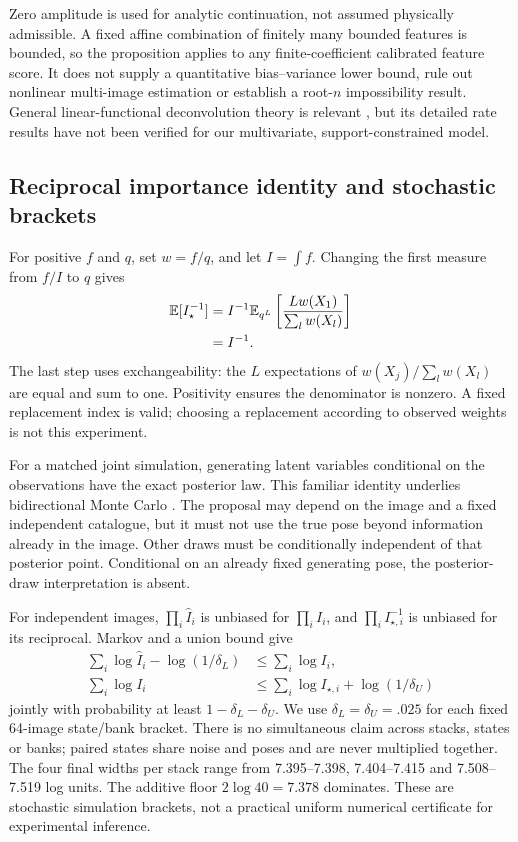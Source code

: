 Zero amplitude is used for analytic continuation, not assumed physically
admissible. A fixed affine combination of finitely many bounded features
is bounded, so the proposition applies to any finite-coefficient calibrated
feature score. It does not supply a quantitative bias--variance lower bound,
rule out nonlinear multi-image estimation or establish a root-$n$ impossibility
result. General linear-functional deconvolution theory is relevant
\citep{pensky2017}, but its detailed rate results have not been verified for
our multivariate, support-constrained model.

\subsection{Reciprocal importance identity and stochastic brackets}
For positive $f$ and $q$, set $w=f/q$, and let $I=\int f$.
Changing the first measure from $f/I$ to $q$ gives
\begin{align}
\mathbb E[I_\star^{-1}]&=I^{-1}\mathbb E_{q^L}
\left[\frac{Lw(X_1)}{\sum_lw(X_l)}\right]\\
&=I^{-1}.\nonumber
\end{align}
The last step uses exchangeability: the $L$ expectations of
$w(X_j)/\sum_lw(X_l)$ are equal and sum to one. Positivity ensures the
denominator is nonzero. A fixed replacement index is valid; choosing a
replacement according to observed weights is not this experiment.

For a matched joint simulation, generating latent variables conditional on
the observations have the exact posterior law. This familiar identity
underlies bidirectional Monte Carlo \citep{grosse2015}. The proposal may
depend on the image and a fixed independent catalogue, but it must not use
the true pose beyond information already in the image. Other draws must be
conditionally independent of that posterior point. Conditional on an
already fixed generating pose, the posterior-draw interpretation is absent.

For independent images, $\prod_i\widehat I_i$ is unbiased for
$\prod_i I_i$, and $\prod_i I_{\star,i}^{-1}$ is unbiased for its
reciprocal. Markov and a union bound give
\begin{align}
\sum_i\log\widehat I_i-\log(1/\delta_L)&\le\sum_i\log I_i,\\
\sum_i\log I_i&\le\sum_i\log I_{\star,i}+\log(1/\delta_U)
\end{align}
jointly with probability at least $1-\delta_L-\delta_U$. We use
$\delta_L=\delta_U=.025$ for each fixed 64-image state/bank bracket.
There is no simultaneous claim across stacks, states or banks; paired
states share noise and poses and are never multiplied together.
The four final widths per stack range from 7.395--7.398, 7.404--7.415 and
7.508--7.519 log units. The additive floor $2\log40=7.378$ dominates.
These are stochastic simulation brackets, not a practical uniform numerical
certificate for experimental inference.

